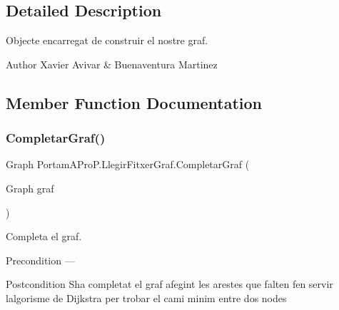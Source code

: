 \subsection{Detailed Description}
Objecte encarregat de construir el nostre graf. 

\begin{DoxyAuthor}{Author}
Xavier Avivar \& Buenaventura Martinez 
\end{DoxyAuthor}


\subsection{Member Function Documentation}
\mbox{\label{class_portam_a_pro_p_1_1_llegir_fitxer_graf_a584bea22b69e7dde9159c7aac0a11de1}} 
\subsubsection{\texorpdfstring{Completar\+Graf()}{CompletarGraf()}}
{\footnotesize\ttfamily Graph Portam\+A\+Pro\+P.\+Llegir\+Fitxer\+Graf.\+Completar\+Graf (\begin{DoxyParamCaption}\item[{Graph}]{graf }\end{DoxyParamCaption})}



Completa el graf. 

\begin{DoxyPrecond}{Precondition}
--- 
\end{DoxyPrecond}
\begin{DoxyPostcond}{Postcondition}
S\textquotesingle{}ha completat el graf afegint les arestes que falten fen servir l\textquotesingle{}algorisme de Dijkstra per trobar el cami minim entre dos nodes 
\end{DoxyPostcond}
\mbox{\label{class_portam_a_pro_p_1_1_llegir_fitxer_graf_ad2bb4a17c5af9b5c6294f6ea1a17f63d}} 
